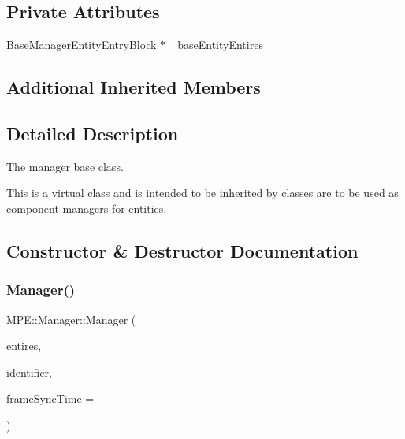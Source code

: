 \subsection*{Private Attributes}
\begin{DoxyCompactItemize}
\item 
\hyperlink{struct_m_p_e_1_1_base_manager_entity_entry_block}{Base\+Manager\+Entity\+Entry\+Block} $\ast$ \hyperlink{class_m_p_e_1_1_manager_a5d8d764913aecc8a92ad83790570df86}{\+\_\+base\+Entity\+Entires}
\end{DoxyCompactItemize}
\subsection*{Additional Inherited Members}


\subsection{Detailed Description}
The manager base class. 

This is a virtual class and is intended to be inherited by classes are to be used as component managers for entities. 

\subsection{Constructor \& Destructor Documentation}
\mbox{\label{class_m_p_e_1_1_manager_a16591d627df08536ce27b7d791347269}} 
\subsubsection{\texorpdfstring{Manager()}{Manager()}}
{\footnotesize\ttfamily M\+P\+E\+::\+Manager\+::\+Manager (\begin{DoxyParamCaption}\item[{\hyperlink{struct_m_p_e_1_1_base_manager_entity_entry_block}{Base\+Manager\+Entity\+Entry\+Block} $\ast$}]{entires,  }\item[{\hyperlink{namespace_m_p_e_a16447295e3105bd2ba2a9ea303566175}{thread\+Identifier}}]{identifier,  }\item[{uint8\+\_\+t}]{frame\+Sync\+Time = {} }\end{DoxyParamCaption})\hspace{0.3cm}{\ttfamily [protected]}}

